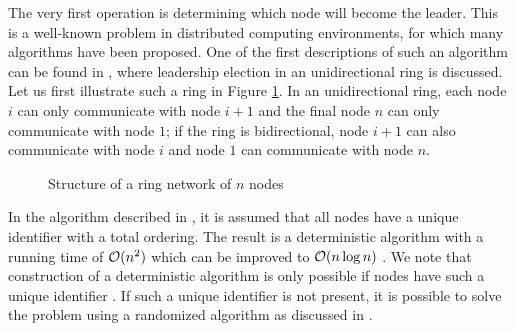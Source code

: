The very first operation is determining which node will become the leader. This is a well-known problem in distributed computing environments, for which many algorithms have been proposed. One of the first descriptions of such an algorithm can be found in \cite{lelann77distsys}, where leadership election in an unidirectional ring is discussed. Let us first illustrate such a ring in Figure \ref{fig:ringnetwork}. In an unidirectional ring, each node $i$ can only communicate with node $i+1$ and the final node $n$ can only communicate with node $1$; if the ring is bidirectional, node $i+1$ can also communicate with node $i$ and node $1$ can communicate with node $n$.

\begin{figure}
 \centering
 \caption{\label{fig:ringnetwork} Structure of a ring network of $n$ nodes}
\end{figure}

In the algorithm described in \cite{lelann77distsys}, it is assumed that all nodes have a unique identifier with a total ordering. The result is a deterministic algorithm with a running time of $\mathcal{O}(n^2)$ which can be improved to $\mathcal{O}(n \log n)$ \cite{chang79decentextrma}. We note that construction of a deterministic algorithm is only possible if nodes have such a unique identifier \cite[Theorem 3.1]{lynch96distalgo}. If such a unique identifier is not present, it is possible to solve the problem using a randomized algorithm as discussed in \cite{itairodeh97symbreak}.

